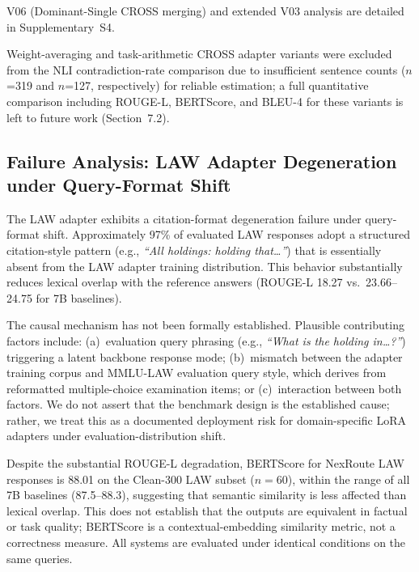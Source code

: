 \documentclass[a4paper,fleql,doubleblind]{cas-sc}
\begin{document}
V06 (Dominant-Single CROSS merging) and extended V03 analysis are detailed
in Supplementary~S4.

Weight-averaging and task-arithmetic CROSS adapter variants were excluded from the NLI contradiction-rate comparison due to insufficient sentence counts ($n$=319 and $n$=127, respectively) for reliable estimation; a full quantitative comparison including ROUGE-L, BERTScore, and BLEU-4 for these variants is left to future work (Section~7.2).

\subsection{Failure Analysis: LAW Adapter Degeneration under Query-Format Shift}
\label{ssec:law-characteristics}

The LAW adapter exhibits a citation-format degeneration failure under query-format
shift.
Approximately 97\% of evaluated LAW responses adopt a structured citation-style
pattern (e.g., \textit{``All holdings: holding that\ldots''}) that is essentially
absent from the LAW adapter training distribution.
This behavior substantially reduces lexical overlap with the reference answers
(ROUGE-L 18.27 vs.\ 23.66--24.75 for 7B baselines).

The causal mechanism has not been formally established.
Plausible contributing factors include: (a)~evaluation query phrasing
(e.g., \textit{``What is the holding in\ldots?''}) triggering a latent backbone
response mode; (b)~mismatch between the adapter training corpus and MMLU-LAW
evaluation query style, which derives from reformatted multiple-choice examination
items; or (c)~interaction between both factors.
We do not assert that the benchmark design is the established cause; rather,
we treat this as a documented deployment risk for domain-specific LoRA adapters
under evaluation-distribution shift.

Despite the substantial ROUGE-L degradation, BERTScore for NexRoute LAW responses
is 88.01 on the Clean-300 LAW subset ($n{=}60$), within the range of all 7B
baselines (87.5--88.3), suggesting that semantic similarity is less affected than
lexical overlap.
This does not establish that the outputs are equivalent in factual or task quality;
BERTScore is a contextual-embedding similarity metric, not a correctness measure.
All systems are evaluated under identical conditions on the same queries.
\end{document}
